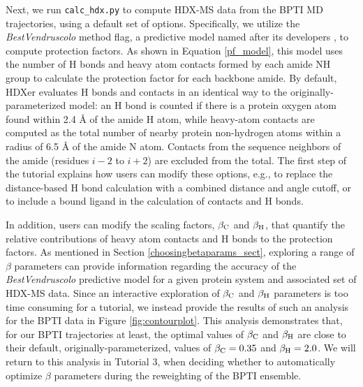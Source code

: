 \documentclass[9pt,tutorial,ASAPversion]{livecoms}
\begin{document}
Next, we run \texttt{calc\_hdx.py} to compute HDX-MS data from the BPTI MD trajectories, using a default set of options.
Specifically, we utilize the \textit{BestVendruscolo} method flag, a predictive model named after its developers \cite{BestVendruscolo2006}, to compute protection factors.
As shown in Equation \ref{pf_model}, this model uses the number of H bonds and heavy atom contacts formed by each amide NH group to calculate the protection factor for each backbone amide.
By default, HDXer evaluates H bonds and contacts in an identical way to the originally-parameterized model: an H bond is counted if there is a protein oxygen atom found within 2.4 Å of the amide H atom, while heavy-atom contacts are computed as the total number of nearby protein non-hydrogen atoms within a radius of 6.5 Å of the amide N atom.
Contacts from the sequence neighbors of the amide (residues $i-2$ to $i+2$) are excluded from the total.
The first step of the tutorial explains how users can modify these options, e.g., to replace the distance-based H bond calculation with a combined distance and angle cutoff, or to include a bound ligand in the calculation of contacts and H bonds. 

In addition, users can modify the scaling factors, $\beta_\textnormal{C}$ and $\beta_\textnormal{H}$, that quantify the relative contributions of heavy atom contacts and H bonds to the protection factors.
As mentioned in Section \ref{choosingbetaparams_sect}, exploring a range of $\beta$ parameters can provide information regarding the accuracy of the \textit{BestVendruscolo} predictive model for a given protein system and associated set of HDX-MS data.
Since an interactive exploration of $\beta_\textnormal{C}$ and $\beta_\textnormal{H}$ parameters is too time consuming for a tutorial, we instead provide the results of such an analysis for the BPTI data in Figure \ref{fig:contourplot}.
This analysis demonstrates that, for our BPTI trajectories at least, the optimal values of $\beta_\textnormal{C}$ and $\beta_\textnormal{H}$ are close to their default, originally-parameterized, values of $\beta_\textnormal{C} = 0.35$ and $\beta_\textnormal{H} = 2.0$.
We will return to this analysis in Tutorial 3, when deciding whether to automatically optimize $\beta$ parameters during the reweighting of the BPTI ensemble.
\end{document}

